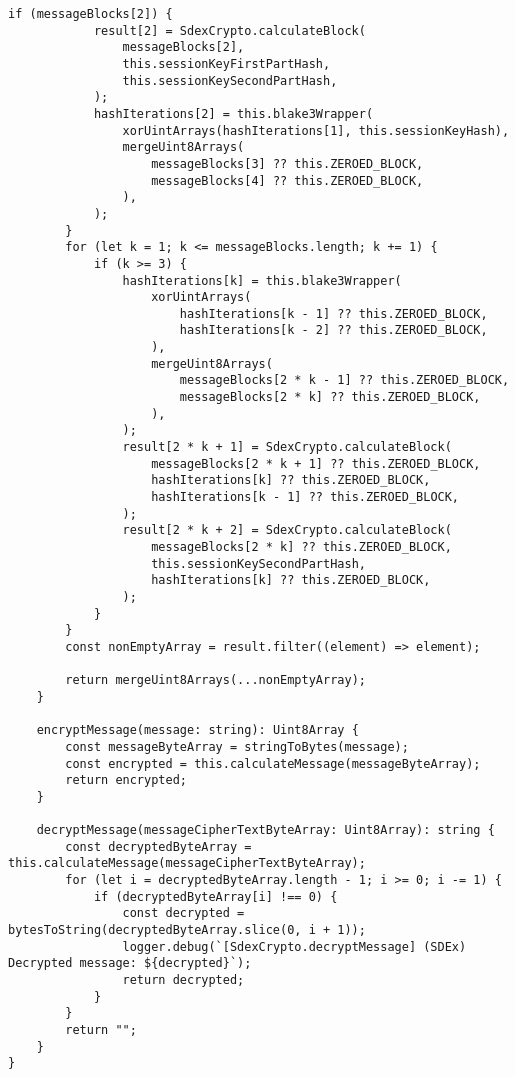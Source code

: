 \documentclass[../main.tex]{subfiles}
\begin{document}
\begin{lstlisting}[caption={Szyfrowanie i deszyfrowanie metodą SDEx - implementacja},label={lst:js_sdex_engine}]
        if (messageBlocks[2]) {
            result[2] = SdexCrypto.calculateBlock(
                messageBlocks[2],
                this.sessionKeyFirstPartHash,
                this.sessionKeySecondPartHash,
            );
            hashIterations[2] = this.blake3Wrapper(
                xorUintArrays(hashIterations[1], this.sessionKeyHash),
                mergeUint8Arrays(
                    messageBlocks[3] ?? this.ZEROED_BLOCK,
                    messageBlocks[4] ?? this.ZEROED_BLOCK,
                ),
            );
        }
        for (let k = 1; k <= messageBlocks.length; k += 1) {
            if (k >= 3) {
                hashIterations[k] = this.blake3Wrapper(
                    xorUintArrays(
                        hashIterations[k - 1] ?? this.ZEROED_BLOCK,
                        hashIterations[k - 2] ?? this.ZEROED_BLOCK,
                    ),
                    mergeUint8Arrays(
                        messageBlocks[2 * k - 1] ?? this.ZEROED_BLOCK,
                        messageBlocks[2 * k] ?? this.ZEROED_BLOCK,
                    ),
                );
                result[2 * k + 1] = SdexCrypto.calculateBlock(
                    messageBlocks[2 * k + 1] ?? this.ZEROED_BLOCK,
                    hashIterations[k] ?? this.ZEROED_BLOCK,
                    hashIterations[k - 1] ?? this.ZEROED_BLOCK,
                );
                result[2 * k + 2] = SdexCrypto.calculateBlock(
                    messageBlocks[2 * k] ?? this.ZEROED_BLOCK,
                    this.sessionKeySecondPartHash,
                    hashIterations[k] ?? this.ZEROED_BLOCK,
                );
            }
        }
        const nonEmptyArray = result.filter((element) => element);

        return mergeUint8Arrays(...nonEmptyArray);
    }

    encryptMessage(message: string): Uint8Array {
        const messageByteArray = stringToBytes(message);
        const encrypted = this.calculateMessage(messageByteArray);
        return encrypted;
    }

    decryptMessage(messageCipherTextByteArray: Uint8Array): string {
        const decryptedByteArray = this.calculateMessage(messageCipherTextByteArray);
        for (let i = decryptedByteArray.length - 1; i >= 0; i -= 1) {
            if (decryptedByteArray[i] !== 0) {
                const decrypted = bytesToString(decryptedByteArray.slice(0, i + 1));
                logger.debug(`[SdexCrypto.decryptMessage] (SDEx) Decrypted message: ${decrypted}`);
                return decrypted;
            }
        }
        return "";
    }
}
\end{lstlisting}
\end{document}

